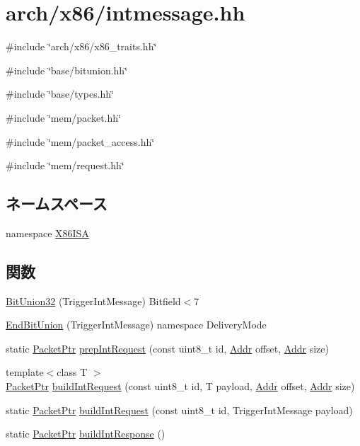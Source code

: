 \hypertarget{intmessage_8hh}{
\section{arch/x86/intmessage.hh}
\label{intmessage_8hh}
}
{\ttfamily \#include \char`\"{}arch/x86/x86\_\-traits.hh\char`\"{}}\par
{\ttfamily \#include \char`\"{}base/bitunion.hh\char`\"{}}\par
{\ttfamily \#include \char`\"{}base/types.hh\char`\"{}}\par
{\ttfamily \#include \char`\"{}mem/packet.hh\char`\"{}}\par
{\ttfamily \#include \char`\"{}mem/packet\_\-access.hh\char`\"{}}\par
{\ttfamily \#include \char`\"{}mem/request.hh\char`\"{}}\par
\subsection*{ネームスペース}
\begin{DoxyCompactItemize}
\item 
namespace \hyperlink{namespaceX86ISA}{X86ISA}
\end{DoxyCompactItemize}
\subsection*{関数}
\begin{DoxyCompactItemize}
\item 
\hyperlink{namespaceX86ISA_a178f2c509b14a166e93fd7104d0389b1}{BitUnion32} (TriggerIntMessage) Bitfield$<$7
\item 
\hyperlink{namespaceX86ISA_a476612a8853e8ae8eeb1e409d16d9732}{EndBitUnion} (TriggerIntMessage) namespace DeliveryMode
\item 
static \hyperlink{classPacket}{PacketPtr} \hyperlink{namespaceX86ISA_adda83aa8585dccaf070e3edf66f2b9ab}{prepIntRequest} (const uint8\_\-t id, \hyperlink{base_2types_8hh_af1bb03d6a4ee096394a6749f0a169232}{Addr} offset, \hyperlink{base_2types_8hh_af1bb03d6a4ee096394a6749f0a169232}{Addr} size)
\item 
{\footnotesize template$<$class T $>$ }\\\hyperlink{classPacket}{PacketPtr} \hyperlink{namespaceX86ISA_a46d6b5d34e25b133b7dc83e7c21eb546}{buildIntRequest} (const uint8\_\-t id, T payload, \hyperlink{base_2types_8hh_af1bb03d6a4ee096394a6749f0a169232}{Addr} offset, \hyperlink{base_2types_8hh_af1bb03d6a4ee096394a6749f0a169232}{Addr} size)
\item 
static \hyperlink{classPacket}{PacketPtr} \hyperlink{namespaceX86ISA_a115b5aa6b868f3e950a574ff86996013}{buildIntRequest} (const uint8\_\-t id, TriggerIntMessage payload)
\item 
static \hyperlink{classPacket}{PacketPtr} \hyperlink{namespaceX86ISA_a70003879ed26e8f0387457d00d504b9c}{buildIntResponse} ()
\end{DoxyCompactItemize}
